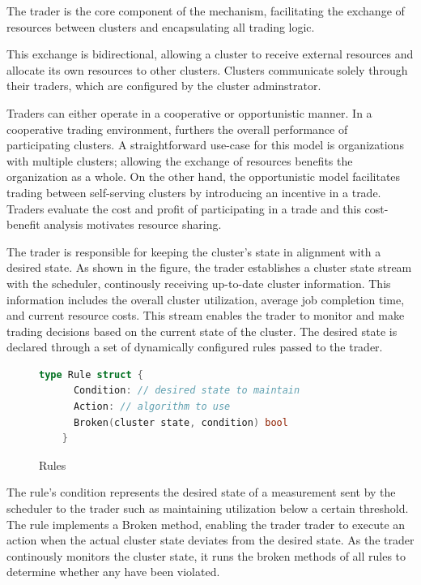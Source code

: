 The trader is the core component of the mechanism, facilitating the
exchange of resources between clusters and encapsulating all trading logic. 

This exchange is bidirectional, allowing a cluster to receive external
resources and allocate its own resources to other clusters. Clusters 
communicate solely through their traders, which are configured by the
cluster adminstrator. 

Traders can either operate in a cooperative or opportunistic manner. In a
cooperative trading environment, furthers the overall performance of
participating clusters. A straightforward use-case for this model is
organizations with multiple clusters; allowing the exchange of resources
benefits the organization as a whole. On the other hand, the opportunistic
model facilitates trading between self-serving clusters by introducing an
incentive in a trade. Traders evaluate the cost and profit of participating in
a trade and this cost-benefit analysis motivates resource sharing.

The trader is responsible for keeping the cluster's state in alignment with a
desired state. As shown in the figure, the trader establishes a cluster state
stream with the scheduler, continously receiving up-to-date cluster
information. This information includes the overall cluster utilization, average
job completion time, and current resource costs. This stream enables the trader
to monitor and make trading decisions based on the current state of the
cluster. The desired state is declared through a set of dynamically
configured rules passed to the trader.

\begin{figure}[H]
  \begin{lstlisting}[language=go]
    type Rule struct {
      Condition: // desired state to maintain
      Action: // algorithm to use
      Broken(cluster state, condition) bool
    } 
  \end{lstlisting}
  \caption{Rules}
\end{figure}

The rule's condition represents the desired state of a measurement sent by the
scheduler to the trader such as maintaining utilization below a certain
threshold. The rule implements a Broken method, enabling the trader trader to execute 
an action when the actual cluster state deviates from the desired state. As the
trader continously monitors the cluster state, it runs the broken methods of
all rules to determine whether any have been violated.

